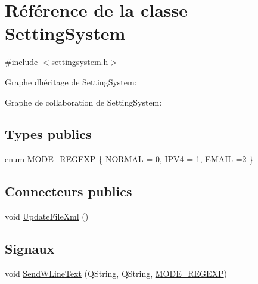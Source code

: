 \hypertarget{class_setting_system}{}\section{Référence de la classe Setting\+System}
\label{class_setting_system}


{\ttfamily \#include $<$settingsystem.\+h$>$}



Graphe d\textquotesingle{}héritage de Setting\+System\+:


Graphe de collaboration de Setting\+System\+:
\subsection*{Types publics}
\begin{DoxyCompactItemize}
\item 
enum \hyperlink{class_setting_system_ad046ad3adffd323e59c0109d59582d76}{M\+O\+D\+E\+\_\+\+R\+E\+G\+E\+X\+P} \{ \hyperlink{class_setting_system_ad046ad3adffd323e59c0109d59582d76a102979f7a99ede723aba0e87008ea725}{N\+O\+R\+M\+A\+L} = 0, 
\hyperlink{class_setting_system_ad046ad3adffd323e59c0109d59582d76ab88493e65b56ce1f70470d84743588c7}{I\+P\+V4} = 1, 
\hyperlink{class_setting_system_ad046ad3adffd323e59c0109d59582d76a3ecfba02a1e80f1394b817f1c9be877e}{E\+M\+A\+I\+L} =2
 \}
\end{DoxyCompactItemize}
\subsection*{Connecteurs publics}
\begin{DoxyCompactItemize}
\item 
void \hyperlink{class_setting_system_ae42307d6521ab351ec50dee2dc85439b}{Update\+File\+Xml} ()
\end{DoxyCompactItemize}
\subsection*{Signaux}
\begin{DoxyCompactItemize}
\item 
void \hyperlink{class_setting_system_a98bbc24c9e94c2b4d4f8c9131478ac1a}{Send\+W\+Line\+Text} (Q\+String, Q\+String, \hyperlink{class_setting_system_ad046ad3adffd323e59c0109d59582d76}{M\+O\+D\+E\+\_\+\+R\+E\+G\+E\+X\+P})
\end{DoxyCompactItemize}
